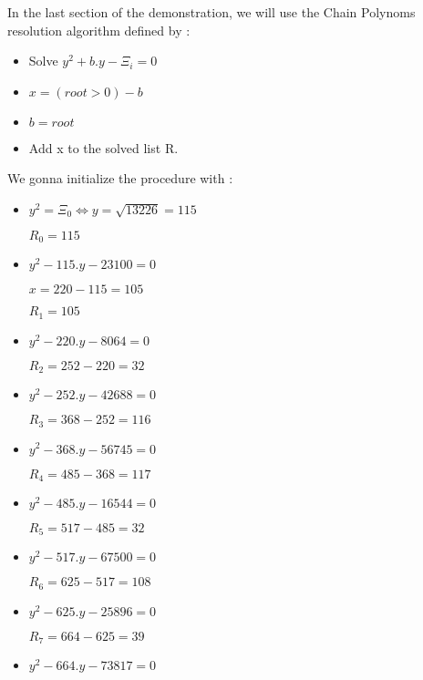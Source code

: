 \documentclass[letterpaper,10pt,english]{sphinxmanual}
\begin{document}
In the last section of the demonstration, we will use the Chain Polynoms resolution algorithm defined by :
\begin{itemize}
  \item Solve $ y^{2}+b.y-\Xi_{i}=0$
  \item $x=(root > 0) - b$
  \item $b = root$
  \item Add x to the solved list R.
\end{itemize}
\newpage
We gonna initialize the procedure with :
\begin{itemize}
  \item \begin{flushleft}
    $ y^{2}=\Xi_{0} \iff y=\sqrt{13226}=115$
    
  $R_{0}=115$
  \end{flushleft}
  \item \begin{flushleft}
  $ y^{2}-115.y-23100=0$
  
  $x=220-115=105$
  
  $R_{1}=105$
\end{flushleft}
  \item \begin{flushleft}
  $ y^{2}-220.y-8064=0$
  
  $R_{2}=252-220=32$
\end{flushleft}
\item \begin{flushleft}
$ y^{2}-252.y-42688=0$

$R_{3}=368-252=116$
\end{flushleft}
\item \begin{flushleft}
  $ y^{2}-368.y-56745=0$
  
  $R_{4}=485-368=117$
\end{flushleft}
\item \begin{flushleft}
  $ y^{2}-485.y-16544=0$
  
  $R_{5}=517-485=32$
\end{flushleft}
\item \begin{flushleft}
  $ y^{2}-517.y-67500=0$
  
  $R_{6}=625-517=108$
\end{flushleft}
\item \begin{flushleft}
  $ y^{2}-625.y-25896=0$
  
  $R_{7}=664-625=39$
\end{flushleft}
\item \begin{flushleft}
  $ y^{2}-664.y-73817=0$
  

\end{flushleft}
\end{itemize}
\end{document}
